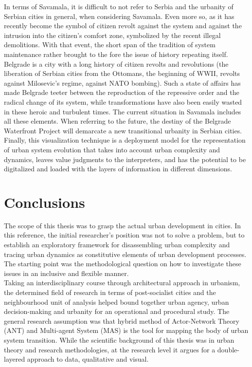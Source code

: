 \documentclass[11pt]{report}
\begin{document}
{{{In terms of Savamala, it is difficult to not refer to Serbia and the urbanity of Serbian cities in general, when considering Savamala. Even more so, as it has recently become the symbol of citizen revolt against the system and against the intrusion into the citizen’s comfort zone, symbolized by the recent illegal demolitions. With that event, the short span of the tradition of system maintenance rather brought to the fore the issue of history repeating itself. Belgrade is a city with a long history of citizen revolts and revolutions (the liberation of Serbian cities from the Ottomans, the beginning of WWII, revolts against Milosevic’s regime, against NATO bombing). Such a  state of affairs has made Belgrade teeter between the reproduction of the repressive order and the radical change of its system, while transformations have also been easily wasted in these heroic and turbulent times. The current situation in Savamala includes all these elements. When referring to the future, the destiny of the Belgrade Waterfront Project will demarcate a new transitional urbanity in Serbian cities.
\\

Finally, this visualization technique is a deployment model for the representation of urban system evolution that takes into account urban complexity and dynamics, leaves value judgments to the interpreters, and has the potential to be digitalized and loaded with the layers of information in different dimensions.


\chapter{Conclusions}


The scope of this thesis was to grasp the actual urban development  in cities.
In this reference, the initial researcher's position was not to solve a problem, but to establish an exploratory framework for disassembling urban complexity and tracing urban dynamics as constitutive elements of urban development processes.
The starting point was the methodological question on how to investigate these issues in an inclusive and flexible manner.
\\

Taking an interdisciplinary course through architectural approach in urbanism, the determined field of research in terms of post-socialist cities and the neighbourhood unit of analysis helped bound together urban agency, urban decision-making and urbanity for an operational and procedural study.
The general research assumption was that hybrid method of Actor-Network Theory (ANT) and Multi-agent System (MAS) is the tool for mapping the body of urban system transition.
While the scientific background of this thesis was in urban theory and research methodologies, at the research level it argues for a double-layered approach to data, qualitative and visual.  
\\

}}}
\end{document}
